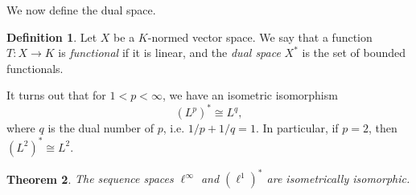 \documentclass[a4paper, openany]{memoir}
\theoremstyle{definition}
\newtheorem{definition}{Definition}[section]
\theoremstyle{plain}
\newtheorem{theorem}[definition]{Theorem}
\begin{document}
    We now define the dual space.
    \begin{definition}
        Let $X$ be a $K$-normed vector space. We say that a function $T \colon X \to K$ is \emph{functional} if it is linear, and the \emph{dual space} $X^*$ is the set of bounded functionals.
    \end{definition}
    \noindent It turns out that for $1 < p < \infty$, we have an isometric isomorphism
    \[(L^p)^* \cong L^q,\]
    where $q$ is the dual number of $p$, i.e. $1/p + 1/q = 1$. In particular, if $p = 2$, then $(L^2)^* \cong L^2$. 

    \begin{theorem}
        The sequence spaces $\ell^\infty$ and $(\ell^1)^*$ are isometrically isomorphic.
    \end{theorem}
\end{document}
